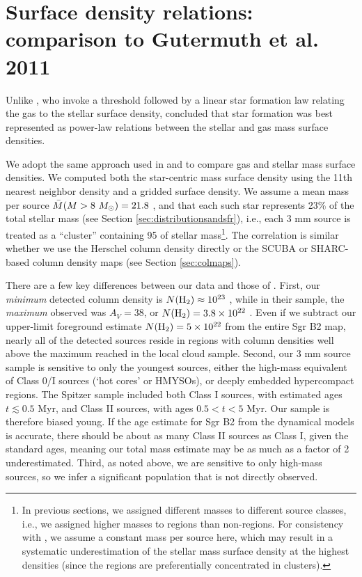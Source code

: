\documentclass[twocolumn]{aastex61}
\begin{document}
\section{Surface density relations: comparison to Gutermuth et al. 2011}
\label{sec:gutermuth}
Unlike \citet{Lada2010a}, who invoke a threshold followed by a linear star
formation law relating the gas to the stellar surface density,
\citet{Gutermuth2011a} concluded that star formation was best represented as
power-law relations between the stellar and gas mass surface densities.

We adopt the same approach used in \citet{Gutermuth2009a} and
\citet{Gutermuth2011a} to compare gas and stellar mass surface densities.  We
computed both the star-centric mass surface density using the 11th nearest
neighbor density and a gridded surface density.  We assume a mean mass per
source $\bar{M}(M>8~M_{\odot})=21.8$ \msun, and that each such star represents 23\%
of the total stellar mass (see Section \ref{sec:distributionsandsfr}), i.e.,
each 3 mm source is treated as a ``cluster'' containing 95 \msun of stellar
mass\footnote{In previous
sections, we assigned different masses to different source classes, i.e., we
assigned higher masses to \hii regions than non-\hii regions.  For consistency
with \citet{Gutermuth2011a}, we assume a constant mass per source here, which
may result in a systematic underestimation of the stellar mass surface density
at the highest densities (since the \hii regions are preferentially
concentrated in clusters).}. The correlation is similar whether we use the
Herschel column density directly or the SCUBA or SHARC-based column density
maps (see Section \ref{sec:colmaps}).  

There are a few key differences between our data and those of
\citet{Gutermuth2011a}.  First, our \emph{minimum} detected column density is
$N(\textrm{H}_{2})\approx10^{23}$ \persc, while in their sample, the \emph{maximum}
observed was $A_V=38$, or $N(\textrm{H}_{2})=3.8\times10^{22}$ \persc.  Even if we subtract
our upper-limit foreground estimate $N(\textrm{H}_{2})=5\times10^{22}$ from the entire
Sgr B2 map, nearly all of the detected sources reside in regions with column
densities well above the maximum reached in the local cloud sample.
Second, our 3 mm source sample is sensitive to only the youngest sources, either
the high-mass equivalent of Class 0/I sources (`hot cores' or HMYSOs), or
deeply embedded hypercompact \hii regions.  The Spitzer sample included both
Class I sources, with estimated ages $t\lesssim0.5$ Myr, and Class II sources, with
ages $0.5 < t < 5$ Myr.  Our sample is therefore biased young.  If the
age estimate for Sgr B2 from the dynamical models
\citep{Longmore2013a,Kruijssen2015a} is accurate, there should be about as many
Class II sources as Class I, given the standard ages, meaning our total mass
estimate may be as much as a factor of 2 underestimated.
Third, as noted above, we are sensitive to only high-mass sources, so we infer
a significant population that is not directly observed.
\end{document}
